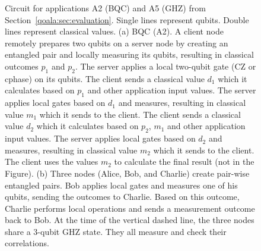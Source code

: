 \begin{figure}
    \centering

    \vspace{1cm}
    \vspace{1cm}

    \caption{
    Circuit for applications A2 (BQC) and A5 (GHZ) from Section~\ref{qoala:sec:evaluation}.
    Single lines represent qubits. Double lines represent classical values.
    (a) BQC (A2). A client node remotely prepares two qubits on a server node by creating an entangled pair and locally measuring its qubits, resulting in classical outcomes $p_1$ and $p_2$.
    The server applies a local two-qubit gate (CZ or cphase) on its qubits.
    The client sends a classical value $d_1$ which it calculates based on $p_1$ and other application input values.
    The server applies local gates based on $d_1$ and measures, resulting in classical value $m_1$ which it sends to the client.
    The client sends a classical value $d_2$ which it calculates based on $p_2$, $m_1$ and other application input values.
    The server applies local gates based on $d_2$ and measures, resulting in classical value $m_2$ which it sends to the client.
    The client uses the values $m_2$ to calculate the final result (not in the Figure).
    (b) Three nodes (Alice, Bob, and Charlie) create pair-wise entangled pairs. Bob applies local gates and measures one of his qubits, sending the outcomes to Charlie.
    Based on this outcome, Charlie performs local operations and sends a measurement outcome back to Bob.
    At the time of the vertical dashed line, the three nodes share a 3-qubit GHZ state. They all measure and check their correlations.
    }
    \label{fig:app:circuits_2}
\end{figure}



